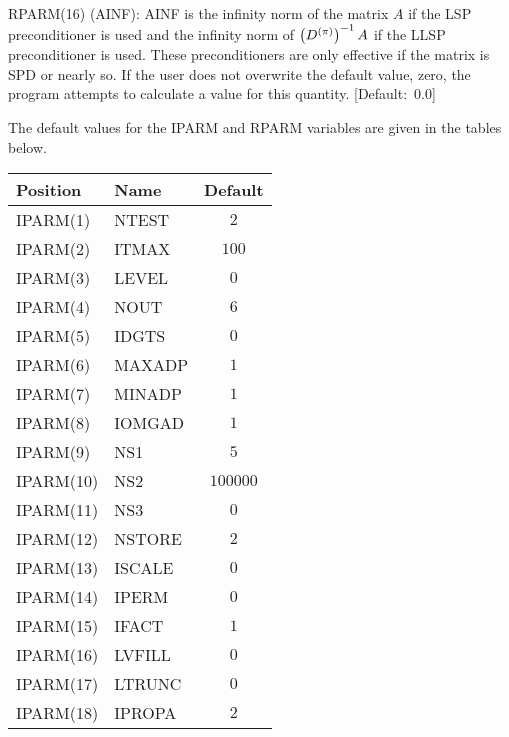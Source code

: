 \begin{list}{}{
               \leftmargin 1.00in \rightmargin 0.25in}
\item[RPARM(16) \hfill](AINF):
         AINF is the infinity norm of the matrix $A$ if the LSP
         preconditioner is used and the infinity norm of 
         $\left(D^{(\pi)}\right)^{-1}A$ if the LLSP preconditioner is used.  
         These preconditioners are only effective if the matrix 
         is SPD or nearly so.  If the user does not overwrite 
         the default value, zero, the program attempts to calculate 
         a value for this quantity. \mbox{[Default: $0.0$]}
 
\end{list}

\newpage
\begin{table}
   The default values for the IPARM and RPARM variables are
 given in the tables below.
\begin{center}
\begin{tabular}{|l|l|c|}                    \hline
   Position   &   Name   &   Default \\     \hline
   IPARM(1)   &   NTEST  &     $2$   \\     \hline
   IPARM(2)   &   ITMAX  &    $100$  \\     \hline
   IPARM(3)   &   LEVEL  &     $0$   \\     \hline
   IPARM(4)   &   NOUT   &     $6$   \\     \hline
   IPARM(5)   &   IDGTS  &     $0$   \\     \hline
   IPARM(6)   &   MAXADP &     $1$   \\     \hline
   IPARM(7)   &   MINADP &     $1$   \\     \hline
   IPARM(8)   &   IOMGAD &     $1$   \\     \hline
   IPARM(9)   &   NS1    &     $5$   \\     \hline
   IPARM(10)  &   NS2    &  $100000$ \\     \hline
   IPARM(11)  &   NS3    &     $0$   \\     \hline
   IPARM(12)  &   NSTORE &     $2$   \\     \hline
   IPARM(13)  &   ISCALE &     $0$   \\     \hline
   IPARM(14)  &   IPERM  &     $0$   \\     \hline
   IPARM(15)  &   IFACT  &     $1$   \\     \hline
   IPARM(16)  &   LVFILL &     $0$   \\     \hline
   IPARM(17)  &   LTRUNC &     $0$   \\     \hline
   IPARM(18)  &   IPROPA &     $2$   \\     \hline

\end{tabular}
\end{center}
\end{table}
